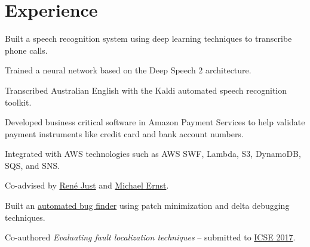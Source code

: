 \documentclass[]{deric-pang-resume}
\begin{document}
\begin{minipage}[t]{0.66\textwidth} 


\section{Experience}
\vspace{\topsep} %
\begin{tightemize}
\item Built a speech recognition system using deep learning techniques to transcribe phone calls.
\item Trained a neural network based on the Deep Speech 2 architecture.
\item Transcribed Australian English with the Kaldi automated speech recognition toolkit.
\end{tightemize}
\sectionsep

\begin{tightemize}
\item Developed business critical software in Amazon Payment Services to help validate payment instruments like credit card and bank account numbers.
\item Integrated with AWS technologies such as AWS SWF, Lambda, S3, DynamoDB, SQS, and SNS.
\end{tightemize}
\sectionsep

\begin{tightemize}
\item Co-advised by \href{https://people.cs.umass.edu/~rjust/}{Ren{\'e} Just} and \href{https://homes.cs.washington.edu/~mernst/}{Michael Ernst}.
\item Built an \href{https://github.com/pderichai/patch-minimization}{automated bug finder} using patch minimization and delta debugging techniques.
\item Co-authored \emph{Evaluating fault localization techniques} -- submitted to \href{http://icse2017.gatech.edu/}{ICSE 2017}.
\end{tightemize}
\sectionsep


\end{minipage}
\end{document}

